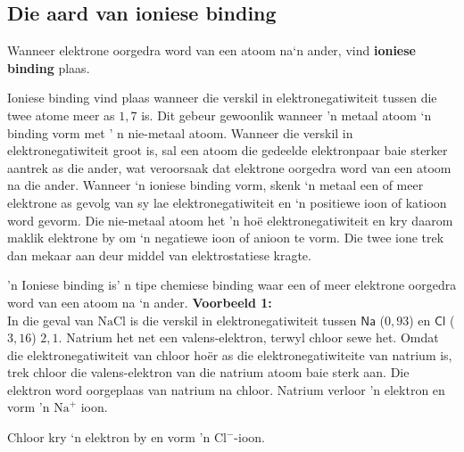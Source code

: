             \subsection*{Die aard van ioniese binding}
            \nopagebreak
        \label{m38684*id142190}Wanneer elektrone oorgedra word van een atoom na‘n ander, vind \textbf{ioniese binding} plaas.\par 
        \label{m38684*id142218}
Ioniese binding vind plaas wanneer die verskil in elektronegatiwiteit tussen die twee atome meer as $1,7$ is. Dit gebeur gewoonlik wanneer 'n metaal atoom ‘n binding vorm met ' n nie-metaal atoom. Wanneer die verskil in elektronegatiwiteit groot is, sal een atoom die gedeelde elektronpaar baie sterker aantrek as die ander, wat veroorsaak dat elektrone oorgedra word van een atoom na die ander. Wanneer ‘n ioniese binding vorm, skenk ‘n metaal een of meer elektrone as gevolg van sy lae elektronegatiwiteit en ‘n positiewe ioon of katioon word gevorm. Die nie-metaal atoom het 'n hoë elektronegatiwiteit en kry daarom maklik elektrone by om ‘n negatiewe ioon of anioon te vorm. Die twee ione trek dan mekaar aan deur middel van elektrostatiese kragte.\par 
\label{m38684*fhsst!!!underscore!!!id456}
 {'n Ioniese binding is' n tipe chemiese binding waar een of meer elektrone oorgedra word van een atoom na ‘n ander.} 
        \label{m38684*id142248}
          \textbf{Voorbeeld 1:}\\
In die geval van $\text{NaCl}$ is die verskil in elektronegatiwiteit tussen $\textsf{Na}$ ($0,93$) en $\textsf{Cl}$ ($3,16$)  $2,1$. Natrium het net een valens-elektron, terwyl chloor sewe het. Omdat die elektronegatiwiteit
van chloor hoër as die elektronegatiwiteite van natrium is,  trek chloor die valens-elektron
van die natrium atoom baie sterk aan. Die elektron word oorgeplaas van natrium na chloor. Natrium
verloor 'n elektron en vorm 'n ${\text{Na}}^{+}$ ioon.\\
  \par
Chloor kry ‘n elektron by en vorm 'n ${\text{Cl}}^{-}$-ioon. \\
